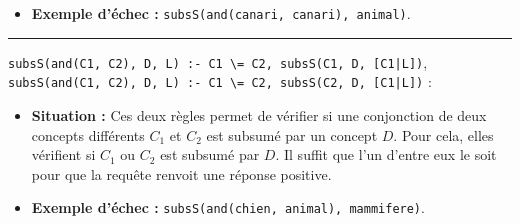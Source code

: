 \documentclass[a4paper,12pt]{report}
\begin{document}
\begin{tcolorbox}[colback=gray!10, colframe=blue!30, coltitle=black, title=Réponse à la question 3.2 - 1/2]
\begin{itemize}
        \vspace{0.1cm}
        \item \textbf{Exemple d'échec :} \texttt{subsS(and(canari, canari), animal)}.
    \end{itemize}


    \vspace{0.5cm}
    \hrule
    \vspace{0.5cm}


    \texttt{subsS(and(C1, C2), D, L) :- C1 \textbackslash= C2, subsS(C1, D, [C1|L])},\\
    \texttt{subsS(and(C1, C2), D, L) :- C1 \textbackslash= C2, subsS(C2, D, [C1|L])} :\\[-0.4cm]
    \begin{itemize}
        \item \textbf{Situation :} Ces deux règles permet de vérifier si une conjonction de deux concepts différents \(C_1\) et \(C_2\) est subsumé par un concept \(D\).
            Pour cela, elles vérifient si \(C_1\) ou \(C_2\) est subsumé par \(D\). Il suffit que l'un d'entre eux le soit pour que la requête renvoit une réponse positive.
        
        \vspace{0.1cm}
        \item \textbf{Exemple d'échec :} \texttt{subsS(and(chien, animal), mammifere)}.
    \end{itemize}

\end{tcolorbox}
\end{document}
